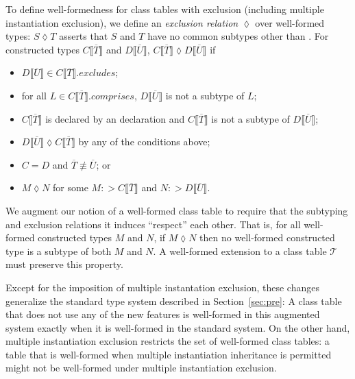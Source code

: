 \documentclass[10pt]{sigplanconf}
\renewcommand{\bar}{\overline}
\newcommand{\exc}{\mathrel{\lozenge}}
\newcommand{\myexcludes}[1]{{#1}.\textit{excludes}}
\newcommand{\mycomprises}[1]{{#1}.\textit{comprises}}
\newcommand{\supertypeof}{\ensuremath{:>}}
\newcommand{\obb}[1]{\ensuremath{\llbracket \bar{#1} \rrbracket}}
\newcommand{\T}{\ensuremath{\mathcal{T}}}
\newcommand{\Bottom}{\TYP{Bottom}}
\begin{document}
To define well-formedness for class tables with exclusion 
(including multiple instantiation exclusion),
we define an \emph{exclusion relation} $\exc$ over well-formed types:
$S \exc T$ asserts that 
$S$ and $T$ have no common subtypes other than \Bottom.
For constructed types $C\obb{T}$ and $D\obb{U}$, 
$C\obb{T} \exc D\obb{U}$ if 
\begin{itemize}

\item
$D\obb{U} \in \myexcludes{C\obb{T}}$; 

\item
for all $L \in \mycomprises{C\obb{T}}$,
$D\obb{U}$ is not a subtype of $L$; 


\item
$C\obb{T}$ is declared by an  declaration 
and $C\obb{T}$ is not a subtype of $D\obb{U}$;

\item
$D\obb{U} \exc C\obb{T}$ by any of the conditions above;

\item
$C = D$ and $\bar{T} \not\equiv \bar{U}$; or 

\item
$M \exc N$ for some $M \supertypeof C\obb{T}$ 
and $N \supertypeof D\obb{U}$.

\end{itemize} 

We augment our notion of a well-formed class table 
to require that the subtyping and exclusion relations it induces 
``respect'' each other.
That is, 
for all well-formed constructed types $M$ and $N$, 
if $M \exc N$ then no well-formed constructed type 
is a subtype of both $M$ and $N$.
A well-formed extension to a class table $\T$ 
must preserve this property.

Except for the imposition of multiple instantation exclusion, 
these changes generalize the standard type system 
described in Section~\ref{sec:pre}: 
A class table that does not use any of the new features 
is well-formed in this augmented system 
exactly when it is well-formed in the standard system.
On the other hand, 
multiple instantiation exclusion
restricts the set of well-formed class tables: 
a table that is well-formed when multiple instantiation inheritance is permitted
might not be well-formed under multiple instantiation exclusion.


\end{document}
